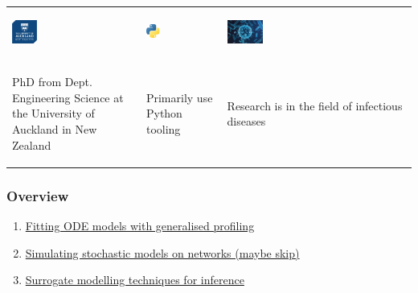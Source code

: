 \documentclass[aspectratio=169]{beamer}
\begin{document}
\begin{frame}
  \centering
  \begin{tabular}{m{} m{} m{}}
    \begin{center}\includegraphics[width=0.2\textwidth]{img/uoa-v-colour2.png}\end{center}%
    &\begin{center}\includegraphics[width=0.2\textwidth]{img/python.jpeg}\end{center}%
    &\begin{center}\includegraphics[width=0.2\textwidth]{img/virus.jpg}\end{center}\\%
    \begin{center}{\scriptsize PhD from Dept. Engineering Science at the University of Auckland in New Zealand}\end{center}
    &\begin{center}{\scriptsize Primarily use Python tooling}\end{center}
    &\begin{center}{\scriptsize Research is in the field of infectious diseases}\end{center}
  \end{tabular}
\end{frame}

\begin{frame}
  \frametitle{Overview}
  \begin{enumerate}
    \item \hyperlink{fitting-ode}{Fitting ODE models with generalised profiling}
    \item \hyperlink{network-sim}{Simulating stochastic models on networks (maybe skip)}
    \item \hyperlink{surrogates}{Surrogate modelling techniques for inference}
  \end{enumerate}
\end{frame}
\end{document}
